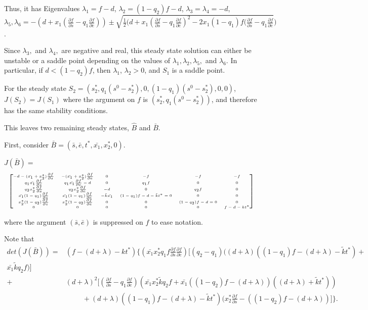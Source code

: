 \documentclass[12pt]{article}
\begin{document}
\noindent Thus, it has Eigenvalues $\lambda_1 = f-d$, $\lambda_2 = (1-q_2)f-d$, $\lambda_3=\lambda_4= -d$, $\lambda_5,\lambda_6 =-(d+x_1(\frac{\partial f}{\partial s}-q_1\frac{\partial f}{\partial e})) \pm \sqrt{\frac{1}{2}(d+x_1(\frac{\partial f}{\partial s}-q_1 \frac{\partial f}{\partial e})^2 - 2 x_1 (1-q_1) f (\frac{\partial f}{\partial s}-q_1 \frac{\partial f}{\partial e}})$. 

\noindent Since $\lambda_3 ,$ and $ \lambda_4 ,$ are negative and real, this steady state solution can either be unstable or a saddle point depending on the values of $\lambda_1 , \lambda_2, \lambda_5,$ and $\lambda_6$. In particular, if $d<(1-q_2)f$, then $\lambda_1$, $\lambda_2 >0$, and $S_1$ is a saddle point. 

\noindent For the steady state $S_2=(s_2^*, q_1(s^0-s_2^*),0,(1-q_1)(s^0-s_2^*),0,0)$,\\ $J(S_2)=J(S_1)$ where the argument on $f$ is $(s_2^*, q_1(s^0-s_2^*))$, and therefore has the same stability conditions. 

\noindent This leaves two remaining steady states, $\hat{B}$ and $\bar{B}$. 

\noindent First, consider $\bar{B}=(\bar{s},\bar{e},t^*,\bar{x_1},x_2^*,0)$. 

\noindent $J(\bar{B})=$
\[ 
\tiny
\begin{bmatrix}
-d-(\bar{x_1}+ x_2^*)\frac{\partial f}{\partial s} & -(\bar{x_1}+x_2^*)\frac{\partial f}{\partial e} & 0 & -f & -f & -f\\
q_1 \bar{x_1} \frac{\partial f}{\partial s} & q_1 \bar{x_1} \frac{\partial f}{\partial e} -d & 0 & q_1 f & 0 & 0 \\
q_2 x_2^* \frac{\partial f}{\partial s} & q_2 x_2^* \frac{\partial f}{\partial e} & -d & 0 & q_2 f & 0 \\
\bar{x_1} (1-q_1)\frac{\partial f}{\partial s} & \bar{x_1} (1-q_1)\frac{\partial f}{\partial e} & -\tilde{k} \bar{x_1} & (1-q_1) f-d-\tilde{k}t^*=0 & 0 & 0 \\
x_2^* (1-q_2)\frac{\partial f}{\partial s} & x_2^* (1-q_2) \frac{\partial f}{\partial e} & 0 & 0 & (1-q_2) f-d =0& 0 \\
0 & 0 & 0 & 0 & 0 & f-d-kt^*
\end{bmatrix}
\]

where the argument $(\bar{s},\bar{e})$ is suppressed on $f$ to ease notation. 

\noindent Note that 
\begin{align*}
det(J(\bar{B}))=&(f-(d+\lambda)-kt^*)\bigg\{(\bar{x_1} x_2^* q_1 f \frac{\partial f}{\partial s} \frac{\partial f}{\partial e})\Big[(q_2-q_1)\big( (d+\lambda)((1-q_1)f-(d+\lambda)-\tilde{k} t^*)+\\ \bar{x_1}\tilde{k} q_2 f \big) \Big] \\ +& (d+\lambda)^2 \Big[(\frac{\partial f}{\partial s} - q_1 \frac{\partial f}{\partial e})(\bar{x_1} x_2^* \tilde{k} q_2 f + \bar{x_1}((1-q_2)f-(d+\lambda))((d+\lambda)+\tilde{k} t^*))
\\&\hspace{1cm}  + (d+\lambda)((1-q_1)f-(d+\lambda)-\tilde{k} t^*)(x_2^* \frac{\partial f}{\partial s}-((1-q_2)f-(d+\lambda))\Big]\bigg\}.
\end{align*}
\end{document}
